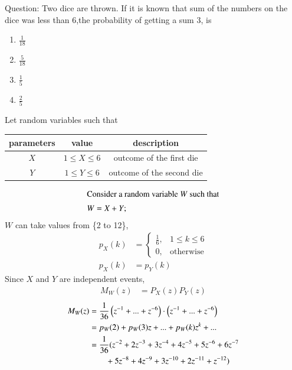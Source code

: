\documentclass[journal,12pt,onecolumn]{IEEEtran}
\theoremstyle{remark}
\begin{document}
%
\providecommand{\pr}[1]{\ensuremath{\Pr\left(#1\right)}}
Question:
Two dice are thrown. If it is known that sum of the numbers on the dice was less than 6,the probability of getting a sum 3, is
\begin{enumerate}[label=\Alph*)]
\item $\frac{1}{18}$ \\
\item $\frac{5}{18}$ \\
\item $\frac{1}{5}$ \\
\item $\frac{2}{5}$ 
\end{enumerate}
\fi
\solution
Let random variables such that
\begin{table}[!ht]
\centering
\begin{tabular}{|c|c|c|}
	\hline
	\textbf{parameters} & \textbf{value} & \textbf{description}\\
	\hline
	$X$ & $1 \leq X \leq 6$ & outcome of the first die \\
	\hline
	$Y$ & $1\leq Y \leq 6$ & outcome of the second die\\
	\hline
\end{tabular}
\end{table}
\begin{align}
\intertext{Consider a random variable $W$ such that}
W =X +Y;
\end{align}
$W$ can take values from \{2 to 12\},
\begin{align}
p_X(k) &= 
	\begin{cases}
		\frac{1}{6}, & 1 \leq k \leq 6 \\
		0, & \text{otherwise}
	\end{cases}\\
	p_X(k) &= p_Y(k)
\end{align}
Since $X$ and $Y$ are independent events,
\begin{align}
	M_W(z) &= P_{X}(z)P_{Y}(z)
\end{align}
\begin{align}
	M_W(z)  &= \frac{1}{36}\brak{z^{-1}+...+z^{-6}}\cdot\brak{z^{-1}+...+z^{-6}}\\
	&= p_W(2) +p_W(3)z + ... + p_W(k)z^k + ...\\
	&= \frac{1}{36}(z^{-2}+2z^{-3}+3z^{-4}+4z^{-5}+5z^{-6}+6z^{-7}\nonumber\\&\qquad+5z^{-8}+4z^{-9}+3z^{-10}+2z^{-11}+z^{-12}) \label{eq:11}
\end{align}
\end{document}
